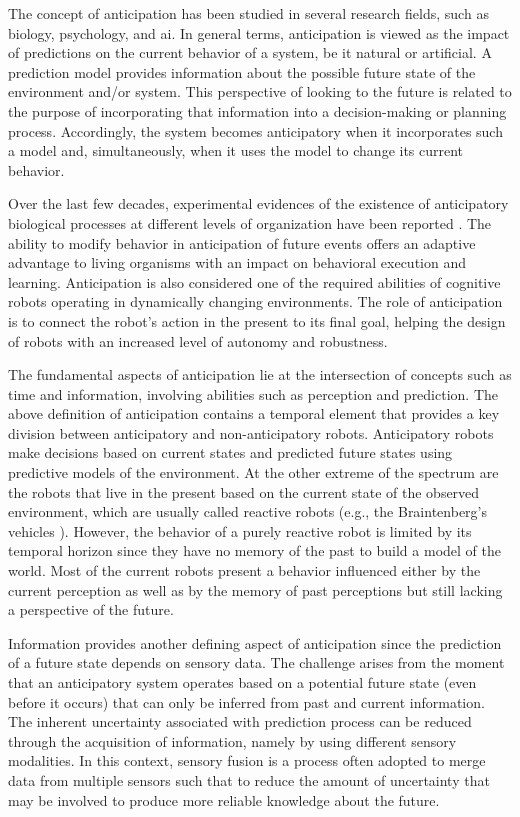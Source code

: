 The concept of anticipation has been studied in several research fields, such as biology, psychology, and \acl{ai}. In general terms, anticipation is viewed as the impact of predictions on the current behavior of a system, be it natural or artificial. A prediction model provides information about the possible future state of the environment and/or system. This perspective of looking to the future is related to the purpose of incorporating that information into a decision-making or planning process. Accordingly, the system becomes anticipatory when it incorporates such a model and, simultaneously, when it uses the model to change its current behavior.

Over the last few decades, experimental evidences of the existence of anticipatory biological processes at different levels of organization have been reported \cite{Deans2021,Poli2010}. The ability to modify behavior in anticipation of future events offers an adaptive advantage to living organisms with an impact on behavioral execution and learning. Anticipation is also considered one of the required abilities of cognitive robots operating in dynamically changing environments. The role of anticipation is to connect the robot’s action in the present to its final goal, helping the design of robots with an increased level of autonomy and robustness.

The fundamental aspects of anticipation lie at the intersection of concepts such as time and information, involving abilities such as perception and prediction. The above definition of anticipation contains a temporal element that provides a key division between anticipatory and non-anticipatory robots. Anticipatory robots make decisions based on current states and predicted future states using predictive models of the environment. At the other extreme of the spectrum are the robots that live in the present based on the current state of the observed environment, which are usually called reactive robots (e.g., the Braintenberg’s vehicles \cite{Braitenberg1986}). However, the behavior of a purely reactive robot is limited by its temporal horizon since they have no memory of the past to build a model of the world. Most of the current robots present a behavior influenced either by the current perception as well as by the memory of past perceptions but still lacking a perspective of the future.

Information provides another defining aspect of anticipation since the prediction of a future state depends on sensory data. The challenge arises from the moment that an anticipatory system operates based on a potential future state (even before it occurs) that can only be inferred from past and current information. The inherent uncertainty associated with prediction process can be reduced through the acquisition of information, namely by using different sensory modalities. In this context, sensory fusion is a process often adopted to merge data from multiple sensors such that to reduce the amount of uncertainty that may be involved to produce more reliable knowledge about the future.

